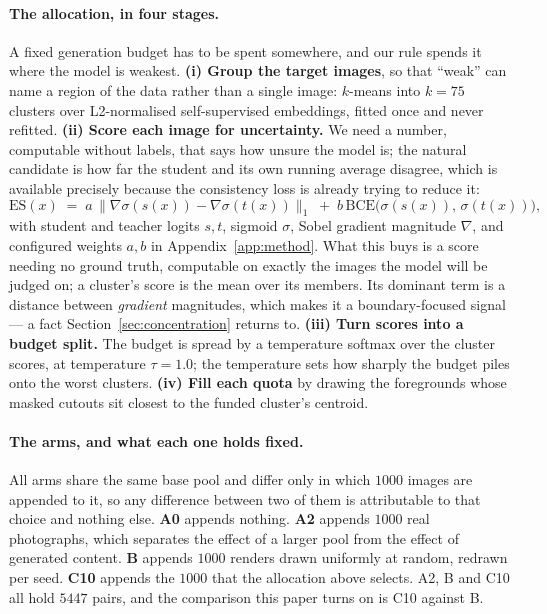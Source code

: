 \documentclass{article} %
\newcommand{\atemp}{\tau}
\begin{document}
\paragraph{The allocation, in four stages.} A fixed generation budget has to be spent somewhere, and
our rule spends it where the model is weakest. \textbf{(i) Group the target images}, so that
``weak'' can name a region of the data rather than a single image: $k$-means into $k = 75$ clusters
over L2-normalised self-supervised embeddings, fitted once and never refitted. \textbf{(ii) Score
each image for uncertainty.} We need a number, computable without labels, that says how unsure the
model is; the natural candidate is how far the student and its own running average disagree, which
is available precisely because the consistency loss is already trying to reduce it:
\begin{equation}
\mathrm{ES}(x) \;=\; a \,\big\| \nabla \sigma(s(x)) - \nabla \sigma(t(x)) \big\|_{1}
\;+\; b \, \mathrm{BCE}\big( \sigma(s(x)),\, \sigma(t(x)) \big),
\label{eq:es}
\end{equation}
with student and teacher logits $s,t$, sigmoid $\sigma$, Sobel gradient magnitude $\nabla$, and
configured weights $a, b$ in Appendix~\ref{app:method}. What this buys is a score needing no ground
truth, computable on exactly the images the model will be judged on; a cluster's score is the mean
over its members. Its dominant term is a distance between \emph{gradient} magnitudes, which makes it
a boundary-focused signal --- a fact Section~\ref{sec:concentration} returns to. \textbf{(iii) Turn scores into a budget split.} The
budget is spread by a temperature softmax over the cluster scores, at temperature
$\atemp = 1.0$; the temperature sets how sharply the budget piles onto the worst clusters.
\textbf{(iv) Fill each quota} by drawing the foregrounds whose masked cutouts sit closest to the
funded cluster's centroid.

\paragraph{The arms, and what each one holds fixed.} All arms share the same base pool and differ
only in which $1000$ images are appended to it, so any difference between two of them is
attributable to that choice and nothing else. \textbf{A0} appends
nothing. \textbf{A2} appends $1000$ real photographs, which separates the effect of a larger pool
from the effect of generated content. \textbf{B} appends $1000$ renders drawn uniformly at random,
redrawn per seed. \textbf{C10} appends the $1000$ that the allocation above selects. A2, B and C10
all hold $5447$ pairs, and the comparison this paper turns on is C10 against B.
\end{document}
